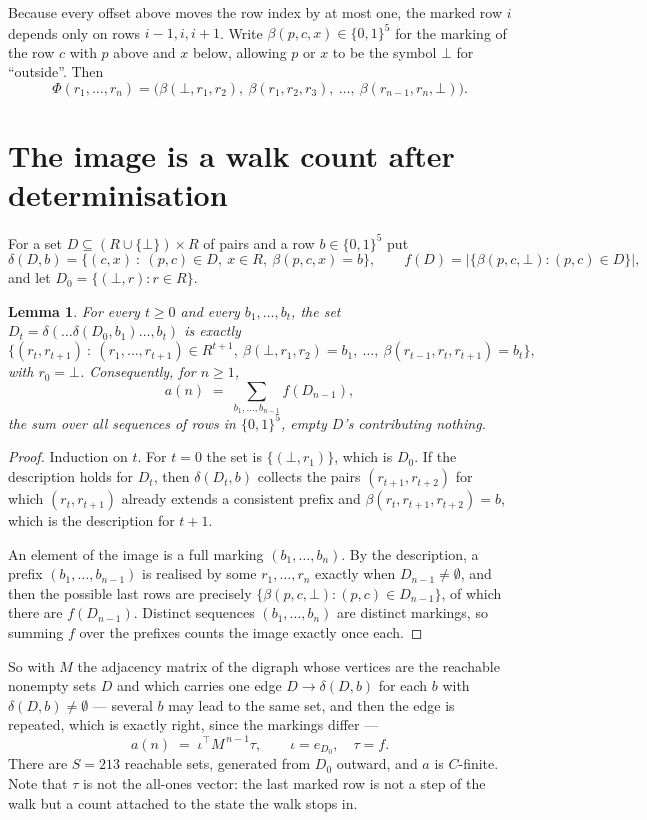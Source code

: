 \documentclass[11pt,a4paper]{article}
\theoremstyle{plain}
\newtheorem{lemma}[theorem]{Lemma}
\theoremstyle{definition}
\begin{document}
Because every offset above moves the row index by at most one, the marked row $i$ depends only
on rows $i-1,i,i+1$. Write $\beta(p,c,x)\in\{0,1\}^{5}$ for the marking of the row $c$
with $p$ above and $x$ below, allowing $p$ or $x$ to be the symbol $\bot$ for ``outside''.
Then
\[
\Phi(r_1,\dots,r_n)=\bigl(\beta(\bot,r_1,r_2),\ \beta(r_1,r_2,r_3),\ \dots,\
\beta(r_{n-1},r_n,\bot)\bigr).
\]

\section{The image is a walk count after determinisation}

For a set $D\subseteq(R\cup\{\bot\})\times R$ of pairs and a row $b\in\{0,1\}^{5}$ put
\[
\delta(D,b)=\{(c,x)\ :\ (p,c)\in D,\ x\in R,\ \beta(p,c,x)=b\},\qquad
f(D)=\bigl|\{\beta(p,c,\bot):(p,c)\in D\}\bigr| ,
\]
and let $D_0=\{(\bot,r):r\in R\}$.

\begin{lemma}\label{lem:det}
For every $t\ge0$ and every $b_1,\dots,b_t$, the set
$D_t=\delta(\dots\delta(D_0,b_1)\dots,b_t)$ is exactly
\[
\{(r_t,r_{t+1})\ :\ (r_1,\dots,r_{t+1})\in R^{t+1},\ \beta(\bot,r_1,r_2)=b_1,\ \dots,\
\beta(r_{t-1},r_t,r_{t+1})=b_t\} ,
\]
with $r_0=\bot$. Consequently, for $n\ge1$,
\[
a(n)\;=\;\sum_{b_1,\dots,b_{n-1}}f(D_{n-1}),
\]
the sum over all sequences of rows in $\{0,1\}^{5}$, empty $D$'s contributing nothing.
\end{lemma}

\begin{proof}
Induction on $t$. For $t=0$ the set is $\{(\bot,r_1)\}$, which is $D_0$. If the description
holds for $D_t$, then $\delta(D_t,b)$ collects the pairs $(r_{t+1},r_{t+2})$ for which
$(r_t,r_{t+1})$ already extends a consistent prefix and
$\beta(r_t,r_{t+1},r_{t+2})=b$, which is the description for $t+1$.

An element of the image is a full marking $(b_1,\dots,b_n)$. By the description, a prefix
$(b_1,\dots,b_{n-1})$ is realised by some $r_1,\dots,r_n$ exactly when $D_{n-1}\neq
\emptyset$, and then the possible last rows are precisely
$\{\beta(p,c,\bot):(p,c)\in D_{n-1}\}$, of which there are $f(D_{n-1})$. Distinct
sequences $(b_1,\dots,b_n)$ are distinct markings, so summing $f$ over the prefixes counts the
image exactly once each.
\end{proof}

So with $M$ the adjacency matrix of the digraph whose vertices are the reachable nonempty sets
$D$ and which carries one edge $D\to\delta(D,b)$ for each $b$ with $\delta(D,b)\neq\emptyset$
--- several $b$ may lead to the same set, and then the edge is repeated, which is exactly
right, since the markings differ ---
\[
a(n)\;=\;\iota^{\!\top}M^{\,n-1}\tau,\qquad \iota=e_{D_0},\quad \tau=f .
\]
There are $S=213$ reachable sets, generated from $D_0$ outward, and $a$ is $C$-finite. Note
that $\tau$ is not the all-ones vector: the last marked row is not a step of the walk but a
count attached to the state the walk stops in.
\end{document}
